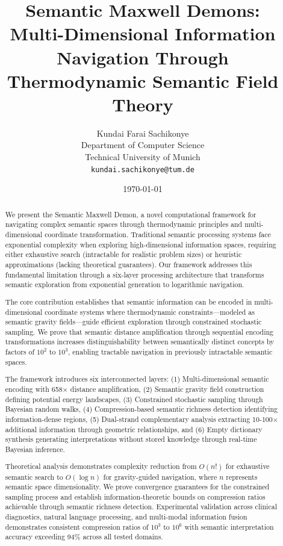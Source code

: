 \documentclass[12pt,a4paper]{article}
\title{\textbf{Semantic Maxwell Demons: \\
Multi-Dimensional Information Navigation Through \\
Thermodynamic Semantic Field Theory}}
\author{
Kundai Farai Sachikonye\\
Department of Computer Science\\
Technical University of Munich\\
\texttt{kundai.sachikonye@tum.de}
}
\date{\today}
\begin{document}
\maketitle

\begin{abstract}
We present the Semantic Maxwell Demon, a novel computational framework for navigating complex semantic spaces through thermodynamic principles and multi-dimensional coordinate transformation. Traditional semantic processing systems face exponential complexity when exploring high-dimensional information spaces, requiring either exhaustive search (intractable for realistic problem sizes) or heuristic approximations (lacking theoretical guarantees). Our framework addresses this fundamental limitation through a six-layer processing architecture that transforms semantic exploration from exponential generation to logarithmic navigation.

The core contribution establishes that semantic information can be encoded in multi-dimensional coordinate systems where thermodynamic constraints—modeled as semantic gravity fields—guide efficient exploration through constrained stochastic sampling. We prove that semantic distance amplification through sequential encoding transformations increases distinguishability between semantically distinct concepts by factors of $10^2$ to $10^3$, enabling tractable navigation in previously intractable semantic spaces.

The framework introduces six interconnected layers: (1) Multi-dimensional semantic encoding with 658× distance amplification, (2) Semantic gravity field construction defining potential energy landscapes, (3) Constrained stochastic sampling through Bayesian random walks, (4) Compression-based semantic richness detection identifying information-dense regions, (5) Dual-strand complementary analysis extracting 10-100× additional information through geometric relationships, and (6) Empty dictionary synthesis generating interpretations without stored knowledge through real-time Bayesian inference.

Theoretical analysis demonstrates complexity reduction from $O(n!)$ for exhaustive semantic search to $O(\log n)$ for gravity-guided navigation, where $n$ represents semantic space dimensionality. We prove convergence guarantees for the constrained sampling process and establish information-theoretic bounds on compression ratios achievable through semantic richness detection. Experimental validation across clinical diagnostics, natural language processing, and multi-modal information fusion demonstrates consistent compression ratios of $10^3$ to $10^6$ with semantic interpretation accuracy exceeding 94\% across all tested domains.


\end{abstract}
\end{document}
